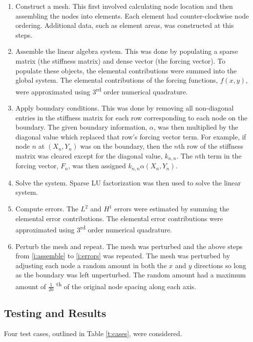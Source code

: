 \documentclass[a4paper, 12pt]{article}
\begin{document}
\begin{enumerate}
\item Construct a mesh. This first involved calculating node location
      and then assembling the nodes into elements. 
      Each element had counter-clockwise node ordering.
      Additional data,
      such as element areas, was constructed at this steps.
\item Assemble the linear algebra system. This was done by populating a
      sparse matrix (the stiffness matrix) and dense vector (the forcing
      vector). To populate these objects, the elemental contributions
      were summed into the global system. The elemental contributions
      of the forcing functions, $f(x,y)$,
      were approximated using 3\textsuperscript{rd} order numerical
      quadrature. \label{i:assemble}
\item Apply boundary conditions. This was done by removing
      all non-diagonal entries in the stiffness matrix for each row 
      corresponding to each node on the boundary. The given boundary
      information, $\alpha$, was then multiplied by the diagonal value
      which replaced that row's forcing vector term. For example, if 
      node $n$ at $(X_n, Y_n)$ was on the boundary, then the $n$th row
      of the stiffness matrix was cleared except for the 
      diagonal value, $k_{n,n}$. The $n$th term in the forcing vector,
      $F_n$, was then assigned $k_{n,n} \alpha( X_n, Y_n)$.
\item Solve the system. Sparse LU factorization was then used 
      to solve the linear system.
\item Compute errors. The $L^2$ and $H^1$ errors were estimated 
      by summing the elemental error contributions. The elemental
      error contributions were approximated using 3\textsuperscript{rd}
      order numerical quadrature. \label{i:errors}
\item Perturb the mesh and repeat. The mesh was perturbed and the above steps
      from \ref{i:assemble} to \ref{i:errors} was repeated. 
      The mesh was perturbed by adjusting each node a random amount in 
      both the $x$ and $y$ directions so long as the boundary was 
      left unperturbed. The random amount had a maximum amount of 
      $\frac{1}{20}$ \textsuperscript{th} of the original node spacing
      along each axis.
\end{enumerate}

\subsection{Testing and Results} \label{ss:testAndResults}
Four test cases, outlined in Table \ref{t:cases}, were considered.
\end{document}
